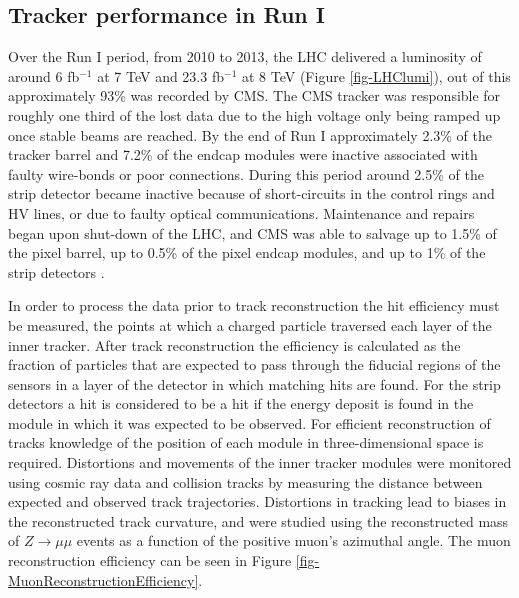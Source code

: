 \subsection{Tracker performance in Run I} \label{subsec-TrackerPerformance}

Over the Run I period, from 2010 to 2013, the LHC delivered a luminosity of around 6 fb$^{-1}$ at 7 TeV and 23.3 fb$^{-1}$ at 8 TeV (Figure \ref{fig-LHClumi}), out of this approximately 93\% was recorded by CMS. The CMS tracker was responsible for roughly one third of the lost data due to the high voltage only being ramped up once stable beams are reached. By the end of Run I approximately 2.3\% of the tracker barrel and 7.2\% of the endcap modules were inactive associated with faulty wire-bonds or poor connections. During this period around 2.5\% of the strip detector became inactive because of short-circuits in the control rings and HV lines, or due to faulty optical communications. Maintenance and repairs began upon shut-down of the LHC, and CMS was able to salvage up to 1.5\% of the pixel barrel, up to 0.5\% of the pixel endcap modules, and up to 1\% of the strip detectors \cite{TrackerPerformance}.

In order to process the data prior to track reconstruction the hit efficiency must be measured, the points at which a charged particle traversed each layer of the inner tracker. After track reconstruction the efficiency is calculated as the fraction of particles that are expected to pass through the fiducial regions of the sensors in a layer of the detector in which matching hits are found. For the strip detectors a hit is considered to be a hit if the energy deposit is found in the module in which it was expected to be observed. For efficient reconstruction of tracks knowledge of the position of each module in three-dimensional space is required. Distortions and movements of the inner tracker modules were monitored using cosmic ray data and collision tracks by measuring the distance between expected and observed track trajectories. Distortions in tracking lead to biases in the reconstructed track curvature, and were studied using the reconstructed mass of $Z \to \mu\mu$ events as a function of the positive muon's azimuthal angle. The muon reconstruction efficiency can be seen in Figure \ref{fig-MuonReconstructionEfficiency}.

